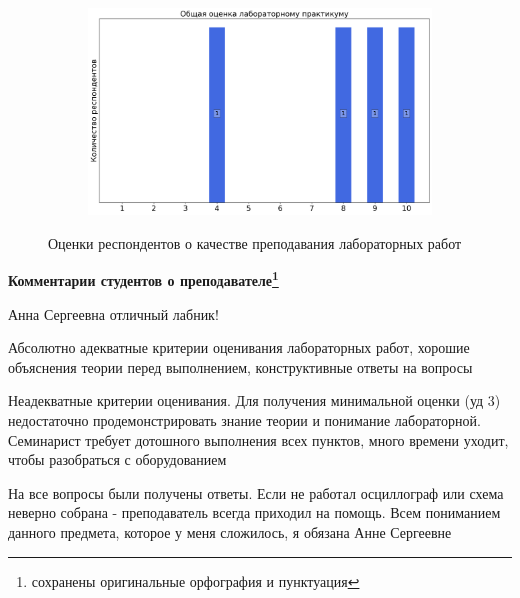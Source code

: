 \begin{figure}[H]
\begin{subfigure}[b]{0.45\textwidth}
			\end{subfigure}
			\begin{subfigure}[b]{0.45\textwidth}
				\centering
				\includegraphics[width=\textwidth]{images/3 course/Аналоговая электроника/labniks-marks-Шабалина А.С.-3.png}
			\end{subfigure}	
			\caption{Оценки респондентов о качестве преподавания лабораторных работ}
		\end{figure}

		\textbf{Комментарии студентов о преподавателе\protect\footnote{сохранены оригинальные орфография и пунктуация}}
            \begin{commentbox} 
                Анна Сергеевна отличный лабник! 
            \end{commentbox} 
        
            \begin{commentbox} 
                Абсолютно адекватные критерии оценивания лабораторных работ, хорошие объяснения теории перед выполнением, конструктивные ответы на вопросы 
            \end{commentbox} 
        
            \begin{commentbox} 
                Неадекватные критерии оценивания. Для получения минимальной оценки (уд 3) недостаточно продемонстрировать знание теории и понимание лабораторной. Семинарист требует дотошного выполнения всех пунктов, много времени уходит, чтобы разобраться с оборудованием 
            \end{commentbox} 
        
            \begin{commentbox} 
                На все вопросы были получены ответы. Если не работал осциллограф или схема неверно собрана - преподаватель всегда приходил на помощь. Всем пониманием данного предмета, которое у меня сложилось, я обязана Анне Сергеевне 
            \end{commentbox}

